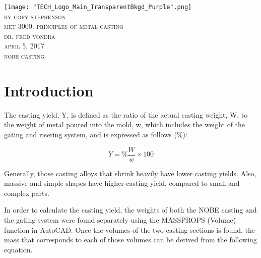 \documentclass{article}
\begin{document}
\begin{titlepage}
	\begin{center}
	\texttt{[image: "TECH\_Logo\_Main\_TransparentBkgd\_Purple".png]} \\
	[2mm]
	\textsc{\Large by cory stephenson} \\
	[0.75cm]
	\textsc{\Large met 3000: principles of metal casting} \\
	[0.75cm]
	\textsc{\Large dr. fred vondra} \\
	[0.75cm]
	\textsc{\Large april 5, 2017} \\
	[0.75cm]
	\textsc{\Large nobe casting}\\
	
	
	 \end{center}
        
\end{titlepage}

\tableofcontents
\thispagestyle{empty}
\cleardoublepage

\vfill
\begin{landscape}


\end{landscape}


\section{Introduction}


The casting yield, Y, is defined as the ratio of the actual casting weight, W, to the weight of metal poured into the mold, w, which includes the weight of the gating and risering system, and is expressed as follows (\%): \cite{LerRao} 

\begin{equation}
Y = \% \frac{W}{w} \times 100
\end{equation}

Generally, those casting alloys that shrink heavily have lower casting yields. Also, massive and simple shapes have higher casting yield, compared to small and complex parts. \cite{LerRao} 

In order to calculate the casting yield, the weights of both the NOBE casting and the gating system were found separately using the MASSPROPS (Volume) function in AutoCAD. Once the volumes of the two casting sections is found, the mass that corresponds to each of those volumes can be derived from the following equation.
\end{document}
